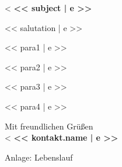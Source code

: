 \documentclass[11pt,a4paper]{article}
\begin{document}
<%
\vspace*{70.5mm}
{\bfseries\color{accent}<< subject | e >>}

\vspace{\baselineskip}
<< salutation | e >>

<< para1 | e >>

<< para2 | e >>

<< para3 | e >>

<< para4 | e >>

\begin{minipage}{\textwidth}
\vspace{2pt}
Mit freundlichen Grüßen\\[1mm]
<%
{\bfseries\color{accent}<< kontakt.name | e >>}
\end{minipage}

\vspace{0.5\baselineskip}
{\small Anlage: Lebenslauf}
\end{document}
